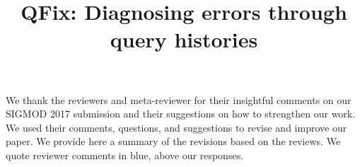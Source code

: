 \documentclass{sig-alternate}
\newcommand{\sys}{QFix\xspace}
\begin{document}


\newcommand{\reviewer}[1]{\itshape{{\color{commentColor} #1}}}
\newcommand{\comskip}{\bigskip}


\renewenvironment{quote}
{\vspace{-1mm}\list{}{\rightmargin=0cm \leftmargin=0cm}%
\item\relax}
{\endlist}

We thank the reviewers and meta-reviewer for their insightful comments on our
SIGMOD 2017 submission and their suggestions on how to strengthen our work. We
used their comments, questions, and suggestions to revise and improve our
paper. We provide here a summary of the revisions based on the reviews. We
quote reviewer comments in blue, above our responses.





% 

\setcounter{equation}{0}
\setcounter{figure}{0}
\setcounter{section}{0}
\setcounter{page}{1}

\title{{\sys}: Diagnosing errors through query histories}

 




\maketitle
\end{document}
